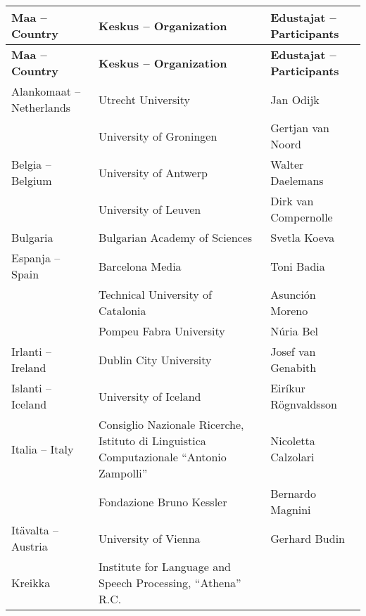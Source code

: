 \documentclass{../../metanetpaper}
\begin{document}
\begin{Parallel}[c]{79mm}{78mm}
\ParallelPar




\ParallelPar


\begin{longtable}{p{3.5cm}|p{5.5cm}|p{5cm}}
 \hline \textbf{Maa -- Country}
 & \textbf{Keskus -- Organization}
 & \textbf{Edustajat -- Participants}
 \\ \hline \endfirsthead
 \hline \textbf{Maa -- Country}
 & \raggedright \textbf{Keskus -- Organization}
 & \textbf{Edustajat -- Participants}
 \\ \hline \endhead
 Alankomaat -- Netherlands
 &  Utrecht University
 &  Jan Odijk
 \\
 &  University of Groningen
 &  Gertjan van Noord
 \\ \hline
 Belgia -- Belgium
 &  University of Antwerp
 &  Walter Daelemans
 \\
 &  University of Leuven
 &  Dirk van Compernolle
 \\ \hline
 Bulgaria
 &  Bulgarian Academy of Sciences
 &  Svetla Koeva
 \\ \hline
 Espanja -- Spain
 &  Barcelona Media
 &  Toni Badia
 \\
 &  Technical University of Catalonia
 &  Asunción Moreno
 \\
 &  Pompeu Fabra University
 &  Núria Bel
 \\ \hline
 Irlanti -- Ireland
 &  Dublin City University
 & Josef van Genabith
 \\ \hline
 Islanti -- Iceland
 &  University of Iceland
 &  Eiríkur Rögnvaldsson
 \\ \hline
 Italia -- Italy
 &  Consiglio Nazionale Ricerche,
    Istituto di Linguistica
    Computazionale “Antonio
    Zampolli”
 &  Nicoletta Calzolari
 \\
 &  Fondazione Bruno Kessler
 &  Bernardo Magnini
 \\ \hline
 Itävalta -- Austria
 &  University of Vienna
 &  Gerhard Budin
 \\ \hline
 Kreikka
 &  Institute for Language and        
    Speech Processing, “Athena” R.C.

\end{longtable}
\end{Parallel}
\end{document}
